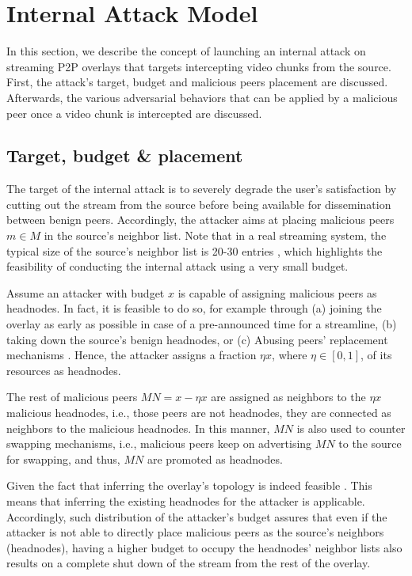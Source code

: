 \section{Internal Attack Model}
\label{sec:Attack}

In this section, we describe the concept of launching an internal attack on streaming P2P overlays that targets intercepting video chunks from the source. 
First, the attack's target, budget and malicious peers placement are discussed.
Afterwards, the various adversarial behaviors that can be applied by a malicious peer once a video chunk is intercepted are discussed.

\subsection{Target, budget \& placement}

The target of the internal attack is to severely degrade the user's satisfaction by cutting out the stream from the source before being available for dissemination between benign peers.
Accordingly, the attacker aims at placing malicious peers $m\in M$ in the source's neighbor list.
Note that in a real streaming system, the typical size of the source's neighbor list is 20-30 entries \cite{neighborlist1,neighborlist2}, which highlights the feasibility of conducting the internal attack using a very small budget.


Assume an attacker with budget $x$ is capable of assigning malicious peers as headnodes.
In fact, it is feasible to do so, for example through (a) joining the overlay as early as possible in case of a pre-announced time for a streamline, (b) taking down the source's benign headnodes, or (c) Abusing peers' replacement mechanisms \cite{nguyen2016swap}.
Hence, the attacker assigns a fraction $\eta x$, where $\eta\in [0,1]$, of its resources as headnodes.

The rest of malicious peers $MN=x-\eta x$ are assigned as neighbors to the $\eta x$ malicious headnodes, i.e., those peers are not headnodes, they are connected as neighbors to the malicious headnodes.
In this manner, $MN$ is also used to counter swapping mechanisms, i.e., malicious peers keep on advertising $MN$ to the source for swapping, and thus, $MN$ are promoted as headnodes.

Given the fact that inferring the overlay's topology is indeed feasible \cite{nguyen2016swap,rbcs}.
This means that inferring the existing headnodes for the attacker is applicable.
Accordingly, such distribution of the attacker's budget assures that even if the attacker is not able to directly place malicious peers as the source's neighbors (headnodes), having a higher budget to occupy the headnodes' neighbor lists also results on a complete shut down of the stream from the rest of the overlay.

